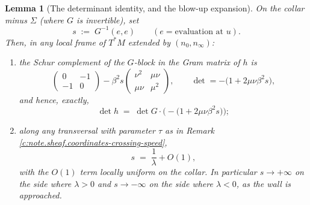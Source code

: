 \documentclass[11pt]{article}
\newtheorem{lemma}[theorem]{Lemma}
\theoremstyle{definition}
\theoremstyle{plain}
\providecommand{\Sig}{}\renewcommand{\Sig}{\Sigma}
\providecommand{\nInf}{}\renewcommand{\nInf}{n_\infty}
\providecommand{\nO}{}\renewcommand{\nO}{n_0}
\begin{document}
\begin{lemma}[The determinant identity, and the blow-up expansion]\label{c:sheaf.determinant-identity-blow-up-expansion}
On the collar minus $\Sig$ (where $G$ is invertible), set
\[
s \;:=\; G^{-1}(e, e) \qquad (e = \text{evaluation at } u) .
\]
Then, in any local frame of $T^*M$ extended by $(\nO, \nInf)$:
\begin{enumerate}
\item the Schur complement of the $G$-block in the Gram matrix of $h$ is
\[
\begin{pmatrix} 0 & -1 \\ -1 & 0 \end{pmatrix} - \beta^2 s \begin{pmatrix} \nu^2 & \mu\nu \\ \mu\nu & \mu^2 \end{pmatrix},
\qquad \det = -\bigl(1 + 2\mu\nu\beta^2 s\bigr),
\]
and hence, exactly,
\[
\det h \;=\; \det G \cdot \bigl(-\bigl(1 + 2\mu\nu\beta^2 s\bigr)\bigr) ;
\]
\item along any transversal with parameter $\tau$ as in Remark \ref{c:note.sheaf.coordinates-crossing-speed},
\[
s \;=\; \frac{1}{\lambda} + O(1),
\]
with the $O(1)$ term locally uniform on the collar. In particular $s \to +\infty$ on the side where $\lambda > 0$ and $s \to -\infty$ on the side where $\lambda < 0$, as the wall is approached.
\end{enumerate}
\end{lemma}
\end{document}
